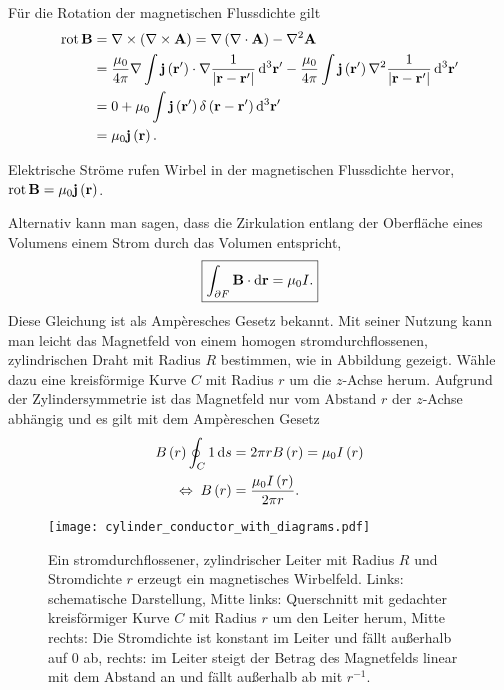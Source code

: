 Für die Rotation der magnetischen Flussdichte gilt
\begin{align}
	\begin{split}
		\label{eq:durchflutungsgesetz_magnetostatik}
		\operatorname{rot} \mathbf{B}&=\nabla \times \left(\nabla \times \mathbf{A}\right)=\nabla \left(\nabla \cdot \mathbf{A}\right)-\nabla ^{2}\mathbf{A}\\
		&=\frac{\mu _{0}}{4\pi }\nabla \int \mathbf{j}\left(\mathbf{r}'\right)\cdot \nabla \frac{1}{\left| \mathbf{r}-\mathbf{r}'\right| }\mathop{}\!\mathrm{d} ^{3}\mathbf{r}'-\frac{\mu _{0}}{4\pi }\int \mathbf{j}\left(\mathbf{r}'\right)\nabla ^{2}\frac{1}{\left| \mathbf{r}-\mathbf{r}'\right| }\mathop{}\!\mathrm{d} ^{3}\mathbf{r}'\\
		&=0+\mu _{0}\int \mathbf{j}\left(\mathbf{r}'\right)\delta \left(\mathbf{r}-\mathbf{r}'\right)\mathop{}\!\mathrm{d} ^{3}\mathbf{r}'\\&=\mu _{0}\mathbf{j}\left(\mathbf{r}\right).
	\end{split}
\end{align}

\begin{formal}
	Elektrische Ströme rufen Wirbel in der magnetischen Flussdichte hervor, $\operatorname{rot} \mathbf{B}=\mu _{0}\mathbf{j}\left(\mathbf{r}\right)$.
\end{formal}
Alternativ kann man sagen, dass die Zirkulation entlang der Oberfläche eines Volumens einem Strom durch das Volumen entspricht,
\begin{equation*}
	\boxed{\int _{\partial F}\mathbf{B}\cdot \mathop{}\!\mathrm{d} \mathbf{r}=\mu _{0}I.}
\end{equation*}
Diese Gleichung ist als Ampèresches Gesetz bekannt. Mit seiner Nutzung kann man leicht das Magnetfeld von einem homogen stromdurchflossenen, zylindrischen Draht mit Radius $R$ bestimmen, wie in Abbildung  gezeigt. Wähle dazu eine kreisförmige Kurve $C$ mit Radius $r$ um die $z$-Achse herum. Aufgrund der Zylindersymmetrie ist das Magnetfeld nur vom Abstand $r$ der $z$-Achse abhängig und es gilt mit dem Ampèreschen Gesetz
\begin{align*}
	B\left(r\right)\oint _{C}1\mathop{}\!\mathrm{d} s & =2\pi rB\left(r\right)=\mu _{0}I\left(r\right) \\
	\;\Leftrightarrow\; B\left(r\right)      & =\frac{\mu _{0}I\left(r\right)}{2\pi r}.
\end{align*}


\begin{figure}[htb]
	\centering
	\texttt{[image: cylinder\_conductor\_with\_diagrams.pdf]}
	\caption{Ein stromdurchflossener, zylindrischer Leiter mit Radius $R$ und Stromdichte $r$ erzeugt ein magnetisches Wirbelfeld. Links: schematische Darstellung, Mitte links: Querschnitt mit gedachter kreisförmiger Kurve $C$ mit Radius $r$ um den Leiter herum, Mitte rechts: Die Stromdichte ist konstant im Leiter und fällt außerhalb auf $0$ ab, rechts: im Leiter steigt der Betrag des Magnetfelds linear mit dem Abstand an und fällt außerhalb ab mit $r^{-1}$.  }
	\label{fig:cylinder_conductor_with_diagrams}
\end{figure}

